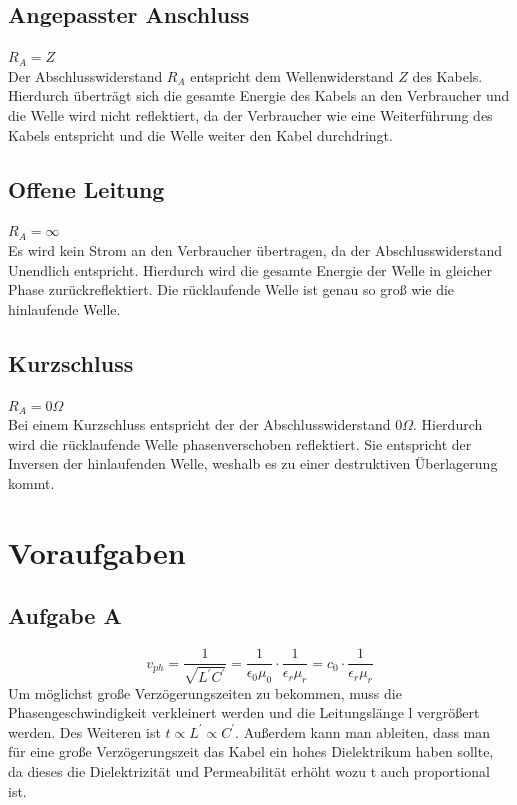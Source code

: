 \documentclass{article}
\begin{document}
\subsection*{Angepasster Anschluss}
$R_A = Z$\\
Der Abschlusswiderstand $R_A$ entspricht dem Wellenwiderstand $Z$ des Kabels. Hierdurch überträgt sich die gesamte Energie des Kabels an den Verbraucher und die Welle wird nicht reflektiert, da der Verbraucher wie eine Weiterführung des Kabels entspricht und die Welle weiter den Kabel durchdringt.


\subsection*{Offene Leitung}
$R_A = \infty$\\
Es wird kein Strom an den Verbraucher übertragen, da der Abschlusswiderstand Unendlich entspricht. Hierdurch wird die gesamte Energie der Welle in gleicher Phase zurückreflektiert. Die rücklaufende Welle ist genau so groß wie die hinlaufende Welle.



\subsection*{Kurzschluss }
$R_A= 0 \Omega$\\
Bei einem Kurzschluss entspricht der der Abschlusswiderstand $ 0 \Omega$. Hierdurch wird die rücklaufende Welle phasenverschoben reflektiert. Sie entspricht der Inversen der hinlaufenden Welle, weshalb es zu einer destruktiven Überlagerung kommt.

\section{Voraufgaben}

\subsection*{Aufgabe A}
\begin{equation}
    v_{ph}= \frac{1}{\sqrt{L^{\prime}C^{\prime}}}= \frac{1}{\epsilon_0\mu_0}\cdot \frac{1}{\epsilon_r\mu_r} =c_0 \cdot \frac{1}{\epsilon_r\mu_r}
\end{equation}
Um möglichst große Verzögerungszeiten zu bekommen, muss die Phasengeschwindigkeit verkleinert werden und die Leitungslänge l vergrößert werden. Des Weiteren ist $t \propto L^{\prime}\propto C^{\prime}$. Außerdem kann man ableiten, dass man für eine große Verzögerungszeit das Kabel ein hohes Dielektrikum haben sollte, da dieses die Dielektrizität und Permeabilität erhöht wozu t auch proportional ist. 
\end{document}
